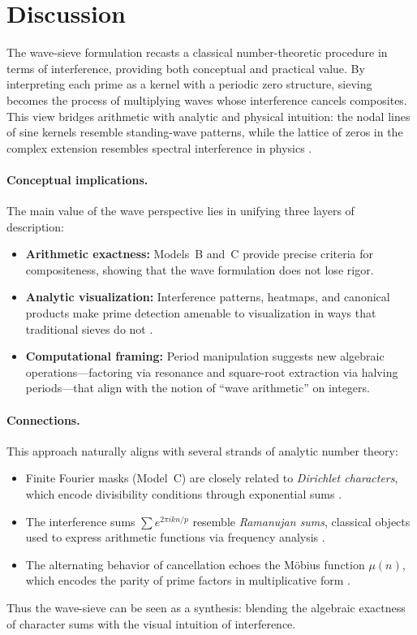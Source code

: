 \documentclass[12pt]{article}
\theoremstyle{definition}
\theoremstyle{remark}
\begin{document}
\section{Discussion}

The wave-sieve formulation recasts a classical number-theoretic procedure in terms of interference, providing both conceptual and practical value. By interpreting each prime as a kernel with a periodic zero structure, sieving becomes the process of multiplying waves whose interference cancels composites. This view bridges arithmetic with analytic and physical intuition: the nodal lines of sine kernels resemble standing-wave patterns, while the lattice of zeros in the complex extension resembles spectral interference in physics \citep{titchmarsh1986riemann, edwards2001riemann}.

\paragraph{Conceptual implications.}  
The main value of the wave perspective lies in unifying three layers of description:
\begin{itemize}
  \item \textbf{Arithmetic exactness:} Models~B and~C provide precise criteria for compositeness, showing that the wave formulation does not lose rigor.
  \item \textbf{Analytic visualization:} Interference patterns, heatmaps, and canonical products make prime detection amenable to visualization in ways that traditional sieves do not \citep{stein2003complex, needham1997visual}.
  \item \textbf{Computational framing:} Period manipulation suggests new algebraic operations—factoring via resonance and square-root extraction via halving periods—that align with the notion of ``wave arithmetic'' on integers.
\end{itemize}

\paragraph{Connections.}  
This approach naturally aligns with several strands of analytic number theory:
\begin{itemize}
  \item Finite Fourier masks (Model~C) are closely related to \emph{Dirichlet characters}, which encode divisibility conditions through exponential sums \citep{davenport2000multiplicative, montgomery2006multiplicative}.
  \item The interference sums $\sum e^{2\pi i kn/p}$ resemble \emph{Ramanujan sums}, classical objects used to express arithmetic functions via frequency analysis \citep{hardy1979ramanujan, murty2012problems}.
  \item The alternating behavior of cancellation echoes the Möbius function $\mu(n)$, which encodes the parity of prime factors in multiplicative form \citep{apostol1976analytic, ivic1985riemann}.
\end{itemize}
Thus the wave-sieve can be seen as a synthesis: blending the algebraic exactness of character sums with the visual intuition of interference.
\end{document}
